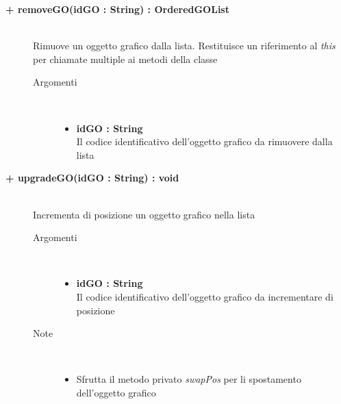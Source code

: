 \begin{description}
	\begin{description}
		\item[\textbf{\color{blue}+ removeGO(idGO : String) : OrderedGOList			}] \hfill \\
			Rimuove un oggetto grafico dalla lista. Restituisce un riferimento al \textit{this} per chiamate multiple ai metodi della classe 
			
		\begin{description}
			\item[Argomenti] \hfill \\
				\begin{itemize}
				
					\item \textbf{idGO : String			} \hfill \\
					Il codice identificativo dell'oggetto grafico da rimuovere dalla lista
					
				\end{itemize}
		\end{description}
	\end{description}
	
	\begin{description}
		\item[\textbf{\color{blue}+ upgradeGO(idGO : String) : void			}] \hfill \\
			Incrementa di posizione un oggetto grafico nella lista
			
		\begin{description}
			\item[Argomenti] \hfill \\
				\begin{itemize}
				
					\item \textbf{idGO : String			} \hfill \\
					Il codice identificativo dell'oggetto grafico da incrementare di posizione
					
				\end{itemize}
				
			\item[Note] \hfill \\
			\begin{itemize}
					\item Sfrutta il metodo privato \textit{swapPos} per li spostamento dell'oggetto grafico
					

\end{itemize}
\end{description}
\end{description}
\end{description}

